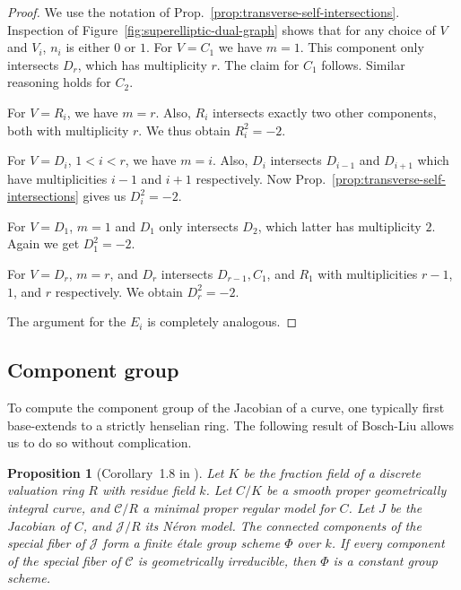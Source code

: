 \documentclass[reqno]{amsart}
\newtheorem{proposition}[thm]{Proposition}
\theoremstyle{definition}
\theoremstyle{remark}
\def\scd{\mathscr{C}}
\def\sj{\mathscr{J}}
\begin{document}
\begin{proof}
  We use the notation of Prop.~\ref{prop:transverse-self-intersections}. Inspection of Figure~\ref{fig:superelliptic-dual-graph} shows that for any choice of $V$ and $V_i$, $n_i$ is either $0$ or $1$. For $V = C_1$ we have $m = 1$. This component only intersects $D_r$, which has multiplicity $r$. The claim for $C_1$ follows. Similar reasoning holds for $C_2$.

  For $V = R_i$, we have $m = r$. Also, $R_i$ intersects exactly two other components, both with multiplicity $r$. We thus obtain $R_i^2 = -2$.

  For $V = D_i$, $1 < i < r$, we have $m = i$. Also, $D_i$ intersects $D_{i-1}$ and $D_{i+1}$ which have multiplicities $i-1$ and $i+1$ respectively. Now Prop.~\ref{prop:transverse-self-intersections} gives us $D_i^2 = -2$.

  For $V = D_1$, $m = 1$ and $D_1$ only intersects $D_2$, which latter has multiplicity $2$. Again we get $D_1^2 = -2$.

  For $V = D_r$, $m = r$, and $D_r$ intersects $D_{r-1}, C_1$, and $R_1$ with multiplicities $r-1$, $1$, and $r$ respectively. We obtain $D_r^2 = -2$.

  The argument for the $E_i$ is completely analogous.
\end{proof}



\subsection{Component group}
\label{sec:component-group}

To compute the component group of the Jacobian of a curve, one typically first base-extends to a strictly henselian ring. The following result of Bosch-Liu allows us to do so without complication.

\begin{proposition}[Corollary~1.8 in \cite{bosch-liu1999}]\label{prop:bosch-liu-phi-constant}
  Let $K$ be the fraction field of a discrete valuation ring $R$ with residue field $k$. Let $C/K$ be a smooth proper geometrically integral curve, and $\scd/R$ a minimal proper regular model for $C$. Let $J$ be the Jacobian of $C$, and $\sj/R$ its N\'eron model. The connected components of the special fiber of $\sj$ form a finite \'etale group scheme $\Phi$ over $k$. If every component of the special fiber of $\scd$ is geometrically irreducible, then $\Phi$ is a constant group scheme.
\end{proposition}
\end{document}
